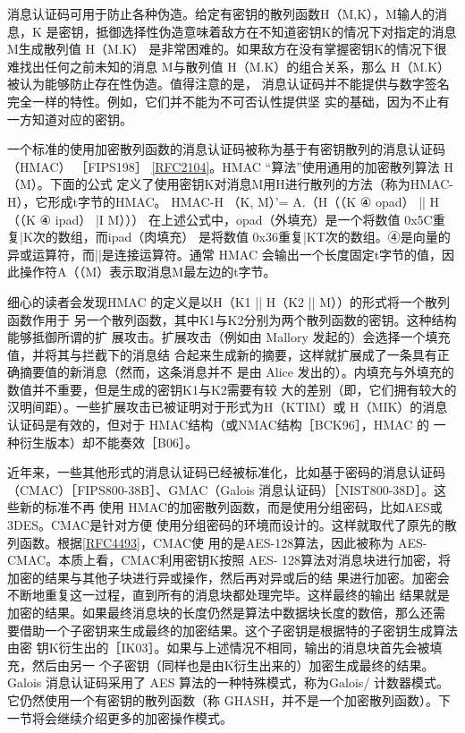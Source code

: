消息认证码可用于防止各种伪造。给定有密钥的散列函数H（M,K），M输人的消息，K
是密钥，抵御选择性伪造意味着敌方在不知道密钥K的情况下对指定的消息 M生成散列值
H（M.K） 是非常困难的。如果敌方在没有掌握密钥K的情况下很难找出任何之前未知的消息
M与散列值 H（M.K）的组合关系，那么 H（M.K） 被认为能够防止存在性伪造。值得注意的是，
消息认证码并不能提供与数字签名完全一样的特性。例如，它们并不能为不可否认性提供坚
实的基础，因为不止有一方知道对应的密钥。

一个标准的使用加密散列函数的消息认证码被称为基于有密钥散列的消息认证码
（HMAC） ［FIPS198］ \href{https://www.rfc-editor.org/rfc/rfc2104}{[RFC2104]}。HMAC “算法”使用通用的加密散列算法 H（M）。下面的公式
定义了使用密钥K对消息M用H进行散列的方法（称为HMAC-H），它形成t字节的HMAC。
HMAC-H （K, M）’= A.（H（（K ④ opad） || H（（K ④ ipad） |I M）））
在上述公式中，opad（外填充）是一个将数值 0x5C重复|K次的数组，而ipad（肉填充）
是将数值 0x36重复|KT次的数组。④是向量的异或运算符，而||是连接运算符。通常 HMAC
会输出一个长度固定t字节的值，因此操作符A（（M）表示取消息M最左边的t字节。

细心的读者会发现HMAC 的定义是以H（K1 || H（K2 || M））的形式将一个散列函数作用于
另一个散列函数，其中K1与K2分别为两个散列函数的密钥。这种结构能够抵御所谓的扩
展攻击。扩展攻击（例如由 Mallory 发起的）会选择一个填充值，并将其与拦截下的消息结
合起来生成新的摘要，这样就扩展成了一条具有正确摘要值的新消息（然而，这条消息并不
是由 Alice 发出的）。内填充与外填充的数值并不重要，但是生成的密钥K1与K2需要有较
大的差别（即，它们拥有较大的汉明间距）。一些扩展攻击已被证明对于形式为H（KTIM）或
H（MIK）的消息认证码是有效的，但对于 HMAC结构（或NMAC结构［BCK96］，HMAC 的
一种衍生版本）却不能奏效［B06］。

近年来，一些其他形式的消息认证码已经被标准化，比如基于密码的消息认证码
（CMAC）［FIPS800-38B］、GMAC（Galois 消息认证码）［NIST800-38D］。这些新的标准不再
使用 HMAC的加密散列函数，而是使用分组密码，比如AES或3DES。CMAC是针对方便
使用分组密码的环境而设计的。这样就取代了原先的散列函数。根据\href{https://www.rfc-editor.org/rfc/rfc4493}{[RFC4493]}，CMAC使
用的是AES-128算法，因此被称为 AES-CMAC。本质上看，CMAC利用密钥K按照 AES-
128算法对消息块进行加密，将加密的结果与其他子块进行异或操作，然后再对异或后的结
果进行加密。加密会不断地重复这一过程，直到所有的消息块都处理完毕。这样最终的输出
结果就是加密的结果。如果最终消息块的长度仍然是算法中数据块长度的数倍，那么还需
要借助一个子密钥来生成最终的加密结果。这个子密钥是根据特的子密钥生成算法由密
钥K衍生出的［IK03］。如果与上述情况不相同，输出的消息块首先会被填充，然后由另一
个子密钥（同样也是由K衍生出来的）加密生成最终的结果。Galois 消息认证码采用了 AES
算法的一种特殊模式，称为Galois/ 计数器模式。它仍然使用一个有密钥的散列函数（称
GHASH，并不是一个加密散列函数）。下一节将会继续介绍更多的加密操作模式。

